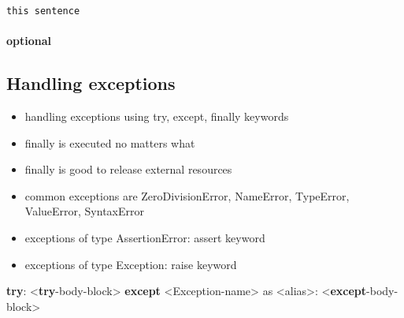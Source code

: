 \documentclass[11pt]{article}
\providecommand{\tightlist}{%
      \setlength{\itemsep}{0pt}\setlength{\parskip}{0pt}}
\newenvironment{Shaded}{}{}
\newcommand{\NormalTok}[1]{{#1}}
\newcommand{\ImportTok}[1]{{#1}}
\newcommand{\ControlFlowTok}[1]{\textcolor[rgb]{0.00,0.44,0.13}{\textbf{{#1}}}}
\newcommand{\OperatorTok}[1]{\textcolor[rgb]{0.40,0.40,0.40}{{#1}}}
\newcommand{\PreprocessorTok}[1]{\textcolor[rgb]{0.74,0.48,0.00}{{#1}}}
\begin{document}
    \begin{Verbatim}[commandchars=\\\{\}]
this sentence
    \end{Verbatim}

    \hypertarget{optional}{%
\paragraph{optional}\label{optional}}

\hypertarget{handling-exceptions}{%
\subsection{Handling exceptions}\label{handling-exceptions}}

\begin{itemize}
\tightlist
\item
  handling exceptions using try, except, finally keywords
\item
  finally is executed no matters what
\item
  finally is good to release external resources
\item
  common exceptions are ZeroDivisionError, NameError, TypeError,
  ValueError, SyntaxError
\item
  exceptions of type AssertionError: assert keyword
\item
  exceptions of type Exception: raise keyword
\end{itemize}

\begin{Shaded}
\begin{Highlighting}[]
\ControlFlowTok{try}\NormalTok{: }
    \OperatorTok{\textless{}}\ControlFlowTok{try}\OperatorTok{{-}}\NormalTok{body}\OperatorTok{{-}}\NormalTok{block}\OperatorTok{\textgreater{}}    
\ControlFlowTok{except} \OperatorTok{\textless{}}\PreprocessorTok{Exception}\OperatorTok{{-}}\NormalTok{name}\OperatorTok{\textgreater{}} \ImportTok{as} \OperatorTok{\textless{}}\NormalTok{alias}\OperatorTok{\textgreater{}}\NormalTok{: }
    \OperatorTok{\textless{}}\ControlFlowTok{except}\OperatorTok{{-}}\NormalTok{body}\OperatorTok{{-}}\NormalTok{block}\OperatorTok{\textgreater{}}        
\end{Highlighting}
\end{Shaded}
\end{document}
